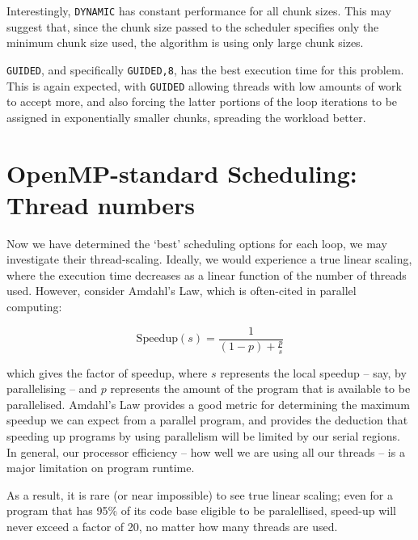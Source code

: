 \documentclass{article} %
\newcommand{\tp}{\texttt}
\begin{document}
Interestingly, \tp{DYNAMIC} has constant performance for all chunk sizes.
This may suggest that, since the chunk size passed to the scheduler specifies only the minimum chunk size used, the algorithm is using only large chunk sizes.

\tp{GUIDED}, and specifically \tp{GUIDED,8}, has the best execution time for this problem. This is again expected, with \tp{GUIDED} allowing threads with low amounts of work to accept more, and also forcing the latter portions of the loop iterations to be assigned in exponentially smaller chunks, spreading the workload better.

\section*{OpenMP-standard Scheduling: Thread numbers}

Now we have determined the `best' scheduling options for each loop, we may investigate their thread-scaling.
Ideally, we would experience a true linear scaling, where the execution time decreases as a linear function of the number of threads used.
However, consider Amdahl's Law, which is often-cited in parallel computing:

$$
\text{Speedup}(s) = \frac{1}{\left( 1 - p\right) + \frac{p}{s}}
$$

which gives the factor of speedup, where $s$ represents the local speedup -- say, by parallelising -- and $p$ represents the amount of the program that is available to be parallelised.
Amdahl's Law provides a good metric for determining the maximum speedup we can expect from a parallel program, and provides the deduction that speeding up programs by using parallelism will be limited by our serial regions. 
In general, our processor efficiency -- how well we are using all our threads -- is a major limitation on program runtime.

As a result, it is rare (or near impossible) to see true linear scaling; even for a program that has 95\% of its code base eligible to be paralellised, speed-up will never exceed a factor of 20, no matter how many threads are used.
\end{document}
